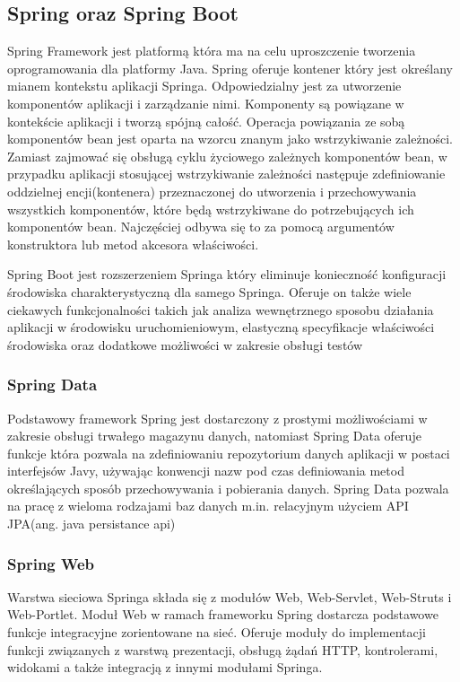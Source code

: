 \subsection{Spring oraz Spring Boot}
Spring Framework jest platformą która ma na celu uproszczenie tworzenia oprogramowania dla platformy Java. Spring oferuje kontener który jest określany mianem kontekstu aplikacji Springa. Odpowiedzialny jest za utworzenie komponentów aplikacji i zarządzanie nimi. Komponenty są powiązane w kontekście aplikacji i tworzą spójną całość. Operacja powiązania ze sobą komponentów bean jest oparta na wzorcu znanym jako wstrzykiwanie zależności. Zamiast zajmować się obsługą cyklu życiowego zależnych komponentów bean, w przypadku aplikacji stosującej wstrzykiwanie zależności następuje zdefiniowanie oddzielnej encji(kontenera) przeznaczonej do utworzenia i przechowywania wszystkich komponentów, które będą wstrzykiwane do potrzebujących ich komponentów bean. Najczęściej odbywa się to za pomocą argumentów konstruktora lub metod akcesora właściwości. 

Spring Boot jest rozszerzeniem Springa który eliminuje konieczność konfiguracji środowiska charakterystyczną dla samego Springa. Oferuje on także wiele ciekawych funkcjonalności takich jak analiza wewnętrznego sposobu działania aplikacji w środowisku uruchomieniowym, elastyczną specyfikacje właściwości środowiska oraz dodatkowe możliwości w zakresie obsługi testów

\subsubsection{Spring Data}
Podstawowy framework Spring jest dostarczony z prostymi możliwościami w zakresie obsługi trwałego magazynu danych, natomiast Spring Data oferuje funkcje która pozwala na zdefiniowaniu repozytorium danych aplikacji w postaci interfejsów Javy, używając konwencji nazw pod czas definiowania metod określających sposób przechowywania i pobierania danych. Spring Data pozwala na pracę z wieloma rodzajami baz danych m.in. relacyjnym użyciem API JPA(ang. java persistance api)

\subsubsection{Spring Web}
Warstwa sieciowa Springa składa się z modułów Web, Web-Servlet, Web-Struts i Web-Portlet. Moduł Web w ramach frameworku Spring dostarcza podstawowe funkcje integracyjne zorientowane na sieć. Oferuje moduły do implementacji funkcji związanych z warstwą prezentacji, obsługą żądań HTTP, kontrolerami, widokami a także integracją z innymi modułami Springa.


